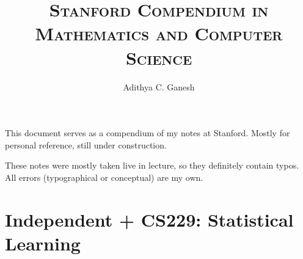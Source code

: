 \title{\textsc{Stanford Compendium in Mathematics and Computer Science}}
\author{Adithya C. Ganesh}
\maketitle

This document serves as a compendium of my notes at Stanford.  Mostly for personal reference, still under construction.

These notes were mostly taken live in lecture, so they definitely contain typos.  All errors (typographical or conceptual) are my own.

\tableofcontents

\mainmatter

\chapter{Independent + CS229: Statistical Learning}

%
%
%
%

%


%

